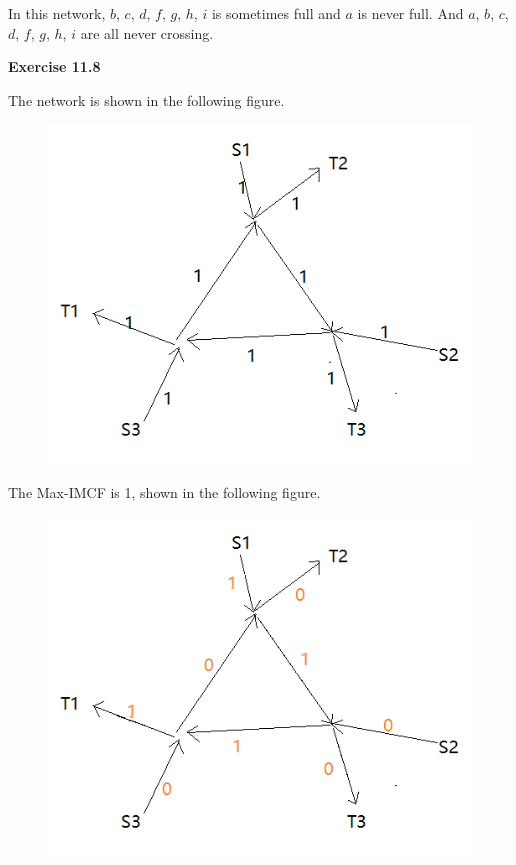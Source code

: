 \documentclass{article} %
\begin{document}
	In this network, $b$, $c$, $d$, $f$, $g$, $h$, $i$ is sometimes full and $a$ is never full. And $a$, $b$, $c$, $d$, $f$, $g$, $h$, $i$ are all never crossing.\par



\textbf{Exercise 11.8}\par
	The network is shown in the following figure.
	\begin{figure}[H]
  	\centering
  	\includegraphics[scale=0.5]{8-1.png}
  	\caption{}
  	\label{}
  	\end{figure}

 	The Max-IMCF is 1, shown in the following figure.
 	\begin{figure}[H]
  	\centering
  	\includegraphics[scale=0.5]{8-2.png}
  	\caption{}
  	\label{}
  	\end{figure}
\end{document}
